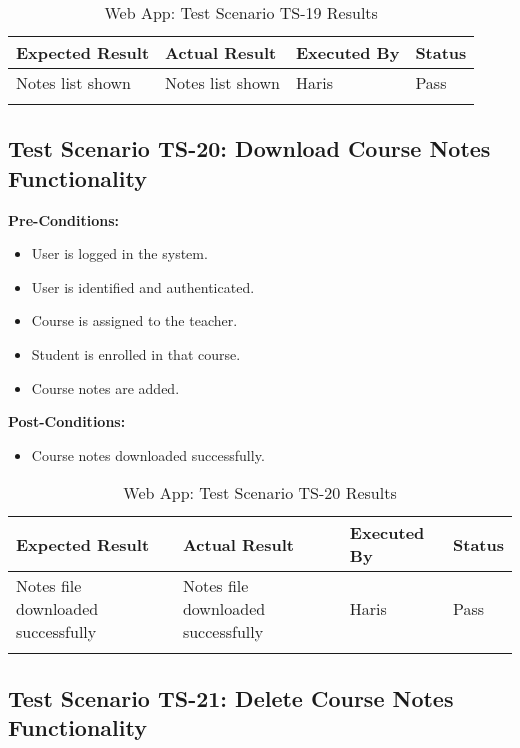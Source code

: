 \bigskip

\begin{longtable}{|p{4cm}|p{4cm}|p{2cm}|p{2cm}|}
\hline
\textbf{Expected Result} & \textbf{Actual Result} & \textbf{Executed By} & \textbf{Status}\\
\hline
Notes list shown &
Notes list shown &
Haris &
Pass \\
\hline

\caption{Web App: Test Scenario TS-19 Results}
\end{longtable}


\subsection{Test Scenario TS-20: Download Course Notes Functionality}

\textbf{Pre-Conditions: }
\begin{itemize}

\item User is logged in the system.
\item User is identified and authenticated.
\item Course is assigned to the teacher.
\item Student is enrolled in that course.
\item Course notes are added.

\end{itemize}

\textbf{Post-Conditions: }
\begin{itemize}

\item Course notes downloaded successfully.

\end{itemize}


\bigskip

\begin{longtable}{|p{4cm}|p{4cm}|p{2cm}|p{2cm}|}
\hline
\textbf{Expected Result} & \textbf{Actual Result} & \textbf{Executed By} & \textbf{Status}\\
\hline
Notes file downloaded successfully &
Notes file downloaded successfully &
Haris &
Pass \\
\hline

\caption{Web App: Test Scenario TS-20 Results}
\end{longtable}


\subsection{Test Scenario TS-21: Delete Course Notes Functionality}

